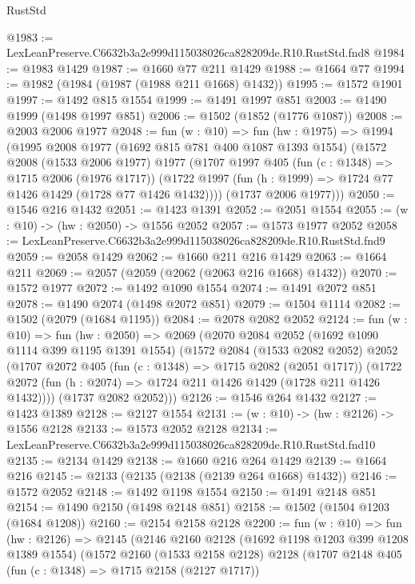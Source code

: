 \begin{lexlean}{RustStd}
\begin{coremodule}
@1983 := LexLeanPreserve.C6632b3a2e999d115038026ca828209de.R10.RustStd.fnd8
@1984 := @1983 @1429
@1987 := @1660 @77 @211 @1429
@1988 := @1664 @77
@1994 := @1982 (@1984 (@1987 (@1988 @211 @1668) @1432))
@1995 := @1572 @1901
@1997 := @1492 @815 @1554
@1999 := @1491 @1997 @851
@2003 := @1490 @1999 (@1498 @1997 @851)
@2006 := @1502 (@1852 (@1776 @1087))
@2008 := @2003 @2006 @1977
@2048 := fun (w : @10) =>
  fun (hw : @1975) =>
  @1994
    (@1995
      @2008
      @1977
      (@1692 @815 @781 @400 @1087 @1393 @1554)
      (@1572
        @2008
        (@1533 @2006 @1977)
        @1977
        (@1707
          @1997
          @405
          (fun (c : @1348) => @1715 @2006 (@1976 @1717))
          (@1722 @1997 (fun (h : @1999) => @1724 @77 @1426 @1429 (@1728 @77 @1426 @1432))))
        (@1737 @2006 @1977)))
@2050 := @1546 @216 @1432
@2051 := @1423 @1391
@2052 := @2051 @1554
@2055 := (w : @10) -> (hw : @2050) -> @1556 @2052
@2057 := @1573 @1977 @2052
@2058 := LexLeanPreserve.C6632b3a2e999d115038026ca828209de.R10.RustStd.fnd9
@2059 := @2058 @1429
@2062 := @1660 @211 @216 @1429
@2063 := @1664 @211
@2069 := @2057 (@2059 (@2062 (@2063 @216 @1668) @1432))
@2070 := @1572 @1977
@2072 := @1492 @1090 @1554
@2074 := @1491 @2072 @851
@2078 := @1490 @2074 (@1498 @2072 @851)
@2079 := @1504 @1114
@2082 := @1502 (@2079 (@1684 @1195))
@2084 := @2078 @2082 @2052
@2124 := fun (w : @10) =>
  fun (hw : @2050) =>
  @2069
    (@2070
      @2084
      @2052
      (@1692 @1090 @1114 @399 @1195 @1391 @1554)
      (@1572
        @2084
        (@1533 @2082 @2052)
        @2052
        (@1707
          @2072
          @405
          (fun (c : @1348) => @1715 @2082 (@2051 @1717))
          (@1722 @2072 (fun (h : @2074) => @1724 @211 @1426 @1429 (@1728 @211 @1426 @1432))))
        (@1737 @2082 @2052)))
@2126 := @1546 @264 @1432
@2127 := @1423 @1389
@2128 := @2127 @1554
@2131 := (w : @10) -> (hw : @2126) -> @1556 @2128
@2133 := @1573 @2052 @2128
@2134 := LexLeanPreserve.C6632b3a2e999d115038026ca828209de.R10.RustStd.fnd10
@2135 := @2134 @1429
@2138 := @1660 @216 @264 @1429
@2139 := @1664 @216
@2145 := @2133 (@2135 (@2138 (@2139 @264 @1668) @1432))
@2146 := @1572 @2052
@2148 := @1492 @1198 @1554
@2150 := @1491 @2148 @851
@2154 := @1490 @2150 (@1498 @2148 @851)
@2158 := @1502 (@1504 @1203 (@1684 @1208))
@2160 := @2154 @2158 @2128
@2200 := fun (w : @10) =>
  fun (hw : @2126) =>
  @2145
    (@2146
      @2160
      @2128
      (@1692 @1198 @1203 @399 @1208 @1389 @1554)
      (@1572
        @2160
        (@1533 @2158 @2128)
        @2128
        (@1707
          @2148
          @405
          (fun (c : @1348) => @1715 @2158 (@2127 @1717))

\end{coremodule}
\end{lexlean}
